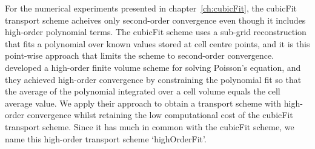 

For the numerical experiments presented in chapter~\ref{ch:cubicFit}, the cubicFit transport scheme acheives only second-order convergence even though it includes high-order polynomial terms.
The cubicFit scheme uses a sub-grid reconstruction that fits a polynomial over known values stored at cell centre points, and it is this point-wise approach that limits the scheme to second-order convergence.
 developed a high-order finite volume scheme for solving Poisson’s equation, and they achieved high-order convergence by constraining the polynomial fit so that the average of the polynomial integrated over a cell volume equals the cell average value.
We apply their approach to obtain a transport scheme with high-order convergence whilst retaining the low computational cost of the cubicFit transport scheme.
Since it has much in common with the cubicFit scheme, we name this high-order transport scheme `highOrderFit'.






